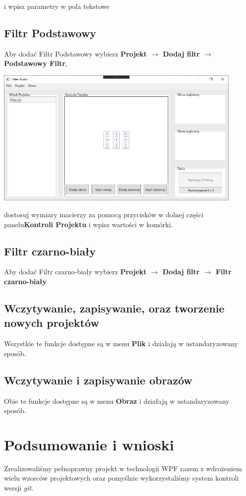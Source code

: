 \documentclass{article}
\begin{document}
i wpisz parametry w pola tekstowe

\subsection{Filtr Podstawowy}
Aby dodać Filtr Podstawowy wybierz \textbf{Projekt $\rightarrow$ Dodaj filtr $\rightarrow$ Podstawowy Filtr},

\bigskip
\includegraphics[width=0.9\textwidth]{matrix.png}
\bigskip

dostosuj wymiary macierzy za pomocą przycisków w dolnej części panelu\textbf{Kontroli Projektu} i wpisz wartości w komórki.

\subsection{Filtr czarno-biały}
Aby dodać Filtr czarno-biały wybierz \textbf{Projekt $\rightarrow$ Dodaj filtr $\rightarrow$ Filtr czarno-biały}

\subsection{Wczytywanie, zapisywanie, oraz tworzenie nowych projektów}
Wszystkie te funkcje dostępne są w menu \textbf{Plik} i działają w ustandaryzowany sposób.

\subsection{Wczytywanie i zapisywanie obrazów}
Obie te funkcje dostępne są w menu \textbf{Obraz} i działają w ustandaryzowany sposób.


\section{Podsumowanie i wnioski}
Zrealizowaliśmy pełnoprawny projekt w technologii WPF razem z wdrożeniem wielu wzorców projektowych oraz pomyślnie
wykorzystaliśmy system kontroli wersji \textit{git}.
\end{document}
